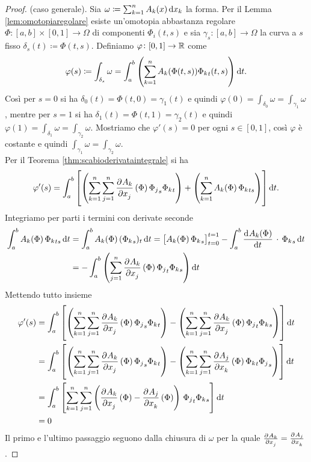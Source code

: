 %
\begin{proof}
	(caso generale).
	Sia $ \omega \coloneqq \sum_{k = 1}^{n} A_k(x) \dif{x_k} $ la forma. Per il Lemma \ref{lem:omotopiaregolare} esiste un'omotopia abbastanza regolare $ \Phi \colon [a, b] \times [0, 1] \to \Omega $ di componenti $ \Phi_i(t, s) $ e sia $ \gamma_s \colon [a, b] \to \Omega $ la curva a $ s $ fisso $ \delta_s(t) \coloneqq \Phi(t, s) $. Definiamo $ \varphi \colon [0, 1] \to \mathbb{R} $ come
	\[
		\varphi(s) \coloneqq \int_{\delta_s} \omega = \int_{a}^{b} \left(\sum_{k = 1}^{n} A_k(\Phi(t, s)) {\Phi_{k}}_t(t, s)\right) \dif{t}.
	\]
	Così per $ s = 0 $ si ha $ \delta_0(t) = \Phi(t, 0) = \gamma_1(t) $ e quindi $ \varphi(0) = \int_{\delta_0} \omega = \int_{\gamma_1} \omega $, mentre per $ s = 1 $ si ha $ \delta_1(t) = \Phi(t, 1) = \gamma_2(t) $ e quindi $ \varphi(1) = \int_{\delta_1} \omega = \int_{\gamma_2} \omega $. Mostriamo che $ \varphi'(s) = 0 $ per ogni $ s \in [0, 1] $, così $ \varphi $ è costante e quindi $ \int_{\gamma_1} \omega = \int_{\gamma_2} \omega $. \\
	Per il Teorema \ref{thm:scabioderivataintegrale} si ha
	\[
		\varphi'(s) = \int_{a}^{b} \left[\left(\sum_{k = 1}^{n} \sum_{j = 1}^{n} \dpd{A_k}{x_j}(\Phi) \, {\Phi_j}_s {\Phi_{k}}_t\right) + \left(\sum_{k = 1}^{n} A_k(\Phi) \, {\Phi_k}_{ts}\right) \right] \dif{t}.
	\]
	Integriamo per parti i termini con derivate seconde
	\begin{align*}
		\int_{a}^{b} A_k(\Phi) \, {\Phi_k}_{ts} \dif{t} & = \int_{a}^{b} A_k(\Phi) \, ({\Phi_k}_{s})_{t} \dif{t} = \left[A_k(\Phi) \, {\Phi_k}_{s}\right]_{t = 0}^{t = 1} - \int_{a}^{b} \dod{A_k(\Phi)}{t} \, \cdot \, {\Phi_k}_{s} \dif{t} \\
		& = - \int_{a}^{b} \left(\sum_{j = 1}^{n} \dpd{A_k}{x_j}(\Phi) \, {\Phi_j}_t {\Phi_k}_s\right) \dif{t}
	\end{align*}
	Mettendo tutto insieme
	\begin{align*}
		\varphi'(s) & = \int_{a}^{b} \left[\left(\sum_{k = 1}^{n} \sum_{j = 1}^{n} \dpd{A_k}{x_j}(\Phi) \, {\Phi_j}_s {\Phi_{k}}_t\right) - \left(\sum_{k = 1}^{n} \sum_{j = 1}^{n} \dpd{A_k}{x_j}(\Phi) \, {\Phi_j}_t {\Phi_k}_s\right) \right] \dif{t} \\
		& = \int_{a}^{b} \left[\left(\sum_{k = 1}^{n} \sum_{j = 1}^{n} \dpd{A_k}{x_j}(\Phi) \, {\Phi_j}_s {\Phi_{k}}_t\right) - \left(\sum_{k = 1}^{n} \sum_{j = 1}^{n} \dpd{A_j}{x_k}(\Phi) \, {\Phi_k}_t {\Phi_j}_s\right) \right] \dif{t} \\
		& = \int_{a}^{b} \left[\sum_{k = 1}^{n} \sum_{j = 1}^{n} \left(\dpd{A_k}{x_j}(\Phi) - \dpd{A_j}{x_k}(\Phi)\right) \, {\Phi_j}_t {\Phi_k}_s\right] \dif{t} \\
		& = 0
	\end{align*}
	Il primo e l'ultimo passaggio seguono dalla chiusura di $ \omega $ per la quale $ \pd{A_k}{x_j} = \pd{A_j}{x_k} $.
\end{proof}

